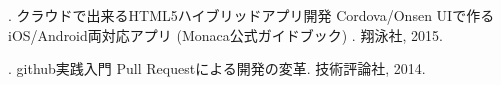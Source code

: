 
\begin{thebibliography}{2}
{}{}.
\newblock クラウドで出来るHTML5ハイブリッドアプリ開発 Cordova/Onsen UIで作るiOS/Android両対応アプリ (Monaca公式ガイドブック) .
\newblock 翔泳社, 2015.

{}{}.
\newblock github実践入門 Pull Requestによる開発の変革.
\newblock 技術評論社, 2014.

\end{thebibliography}
